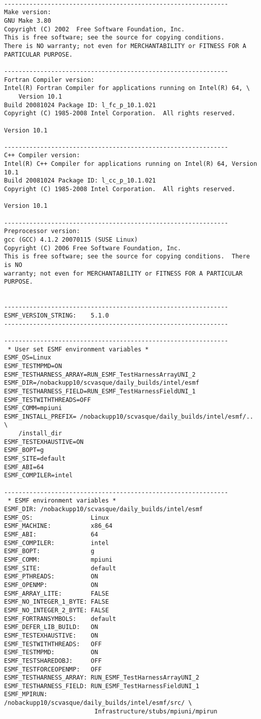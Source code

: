\begin{verbatim}

--------------------------------------------------------------
Make version:
GNU Make 3.80
Copyright (C) 2002  Free Software Foundation, Inc.
This is free software; see the source for copying conditions.
There is NO warranty; not even for MERCHANTABILITY or FITNESS FOR A
PARTICULAR PURPOSE.

--------------------------------------------------------------
Fortran Compiler version:
Intel(R) Fortran Compiler for applications running on Intel(R) 64, \
	Version 10.1    
Build 20081024 Package ID: l_fc_p_10.1.021
Copyright (C) 1985-2008 Intel Corporation.  All rights reserved.

Version 10.1 

--------------------------------------------------------------
C++ Compiler version:
Intel(R) C++ Compiler for applications running on Intel(R) 64, Version 10.1    
Build 20081024 Package ID: l_cc_p_10.1.021
Copyright (C) 1985-2008 Intel Corporation.  All rights reserved.

Version 10.1 

--------------------------------------------------------------
Preprocessor version:
gcc (GCC) 4.1.2 20070115 (SUSE Linux)
Copyright (C) 2006 Free Software Foundation, Inc.
This is free software; see the source for copying conditions.  There is NO
warranty; not even for MERCHANTABILITY or FITNESS FOR A PARTICULAR PURPOSE.


--------------------------------------------------------------
ESMF_VERSION_STRING:    5.1.0
--------------------------------------------------------------
 
--------------------------------------------------------------
 * User set ESMF environment variables *
ESMF_OS=Linux
ESMF_TESTMPMD=ON
ESMF_TESTHARNESS_ARRAY=RUN_ESMF_TestHarnessArrayUNI_2
ESMF_DIR=/nobackupp10/scvasque/daily_builds/intel/esmf
ESMF_TESTHARNESS_FIELD=RUN_ESMF_TestHarnessFieldUNI_1
ESMF_TESTWITHTHREADS=OFF
ESMF_COMM=mpiuni
ESMF_INSTALL_PREFIX= /nobackupp10/scvasque/daily_builds/intel/esmf/.. \
	/install_dir
ESMF_TESTEXHAUSTIVE=ON
ESMF_BOPT=g
ESMF_SITE=default
ESMF_ABI=64
ESMF_COMPILER=intel
 
--------------------------------------------------------------
 * ESMF environment variables *
ESMF_DIR: /nobackupp10/scvasque/daily_builds/intel/esmf
ESMF_OS:                Linux
ESMF_MACHINE:           x86_64
ESMF_ABI:               64
ESMF_COMPILER:          intel
ESMF_BOPT:              g
ESMF_COMM:              mpiuni
ESMF_SITE:              default
ESMF_PTHREADS:          ON
ESMF_OPENMP:            ON
ESMF_ARRAY_LITE:        FALSE
ESMF_NO_INTEGER_1_BYTE: FALSE
ESMF_NO_INTEGER_2_BYTE: FALSE
ESMF_FORTRANSYMBOLS:    default
ESMF_DEFER_LIB_BUILD:   ON
ESMF_TESTEXHAUSTIVE:    ON
ESMF_TESTWITHTHREADS:   OFF
ESMF_TESTMPMD:          ON
ESMF_TESTSHAREDOBJ:     OFF
ESMF_TESTFORCEOPENMP:   OFF
ESMF_TESTHARNESS_ARRAY: RUN_ESMF_TestHarnessArrayUNI_2
ESMF_TESTHARNESS_FIELD: RUN_ESMF_TestHarnessFieldUNI_1
ESMF_MPIRUN:            /nobackupp10/scvasque/daily_builds/intel/esmf/src/ \
                         Infrastructure/stubs/mpiuni/mpirun
 

\end{verbatim}
